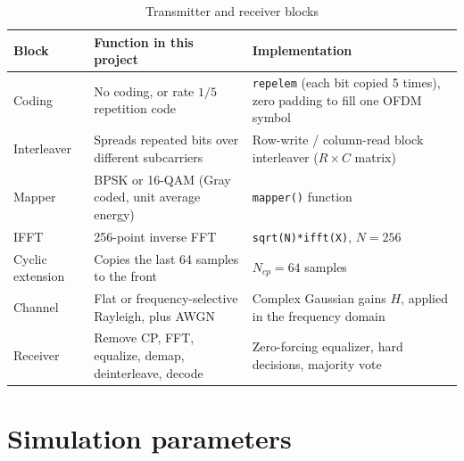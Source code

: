 \documentclass[11pt,a4paper]{article}
\begin{document}
\begin{table}[H]
\centering
\caption{Transmitter and receiver blocks}
\begin{tabular}{p{2.8cm} p{5.2cm} p{5.6cm}}
\toprule
\textbf{Block} & \textbf{Function in this project} & \textbf{Implementation} \\
\midrule
Coding & No coding, or rate $1/5$ repetition code & \texttt{repelem} (each bit copied 5 times), zero padding to fill one OFDM symbol \\
Interleaver & Spreads repeated bits over different subcarriers & Row-write / column-read block interleaver ($R \times C$ matrix) \\
Mapper & BPSK or 16-QAM (Gray coded, unit average energy) & \texttt{mapper()} function \\
IFFT & 256-point inverse FFT & \texttt{sqrt(N)*ifft(X)}, $N = 256$ \\
Cyclic extension & Copies the last 64 samples to the front & $N_{cp} = 64$ samples \\
Channel & Flat or frequency-selective Rayleigh, plus AWGN & Complex Gaussian gains $H$, applied in the frequency domain \\
Receiver & Remove CP, FFT, equalize, demap, deinterleave, decode & Zero-forcing equalizer, hard decisions, majority vote \\
\bottomrule
\end{tabular}
\end{table}

\section{Simulation parameters}
\end{document}
